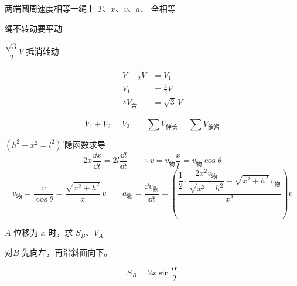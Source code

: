 \noindent 两端圆周速度相等\quad 一绳上 $T$、$x$、$v$、$a$、 全相等%

\noindent 绳不转动要平动

\noindent $\dfrac{\sqrt3}{2}V$ 抵消转动%

\begin{align*}
V+\tfrac12V&=V_1\\
V_1&=\tfrac32V\\
\therefore V_{\text{合}}&=\sqrt3\,V
\end{align*}

\begin{keybox}[伸缩等速]%
\[
V_1+V_2=V_3\qquad \sum V_{\text{伸长}}=\sum V_{\text{缩短}}
\]
\end{keybox}


$(h^{2}+x^{2}=l^{2})'$\quad 隐函数求导
\[
2x\frac{\dd x}{\dd t}=2l\frac{\dd l}{\dd t}\qquad \therefore\ v=v_{\text{物}}\frac{x}{l}=v_{\text{物}}\cos\theta
\]
\[
v_{\text{物}}=\frac{v}{\cos\theta}=\frac{\sqrt{x^{2}+h^{2}}}{x}\,v
\qquad
a_{\text{物}}=\frac{\dd v_{\text{物}}}{\dd t}=\left(\frac{\dfrac{1}{2}\cdot\dfrac{2x^{2}v_{\text{物}}}{\sqrt{x^{2}+h^{2}}}-\sqrt{x^{2}+h^{2}}\,v_{\text{物}}}{x^{2}}\right)v
\]


\noindent $A$ 位移为 $x$ 时，求 $S_B$、$V_A$

\noindent 对$B$ 先向左，再沿斜面向下。

\[
S_B=2x\sin\frac{\alpha}{2}
\]

